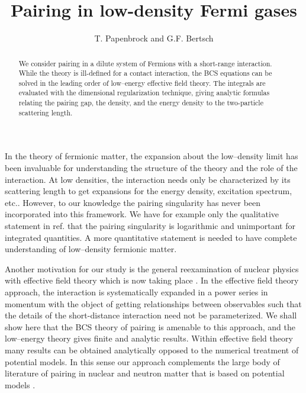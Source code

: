 %    
%
\newcommand{\ignore}[1]{} 
%
%

\draft
\title{Pairing in low-density Fermi gases}
\author{T. Papenbrock and G.F. Bertsch}
\address{Institute for Nuclear Theory\\
University of Washington, Seattle, WA 98195 USA
}
\maketitle
\def\eq#1{eq. (\ref{#1})}
\def\be{\begin{equation}}
\def\ee{\end{equation}} 
\def\ba{\begin{eqnarray}}
\def\ea{\end{eqnarray}} 
\begin{abstract}
We consider pairing in a dilute system of Fermions
with a short-range interaction. While the theory is ill-defined for
a contact interaction, the BCS equations can be solved in the
leading order of low--energy effective field theory.  The integrals
are evaluated with the dimensional regularization technique, giving
analytic formulas relating the pairing gap, the density, and the 
energy density to the two-particle scattering length.
\end{abstract}


In the theory of fermionic matter, the expansion about the low--density
limit has been invaluable for understanding the structure of the
theory and the role of the interaction.  At low densities, the
interaction needs only be characterized by its scattering length
to get expansions for the energy density, excitation spectrum,
etc.\cite{ab63}.  However, to our knowledge the pairing singularity has
never been incorporated into this framework.  We have for
example only the qualitative statement in ref. \cite{ab63} that the pairing 
singularity is logarithmic and unimportant for integrated quantities.  
A more quantitative statement is needed to have complete understanding
of low--density fermionic matter. 

Another motivation for our study is the general reexamination of nuclear 
physics with effective field theory which is now taking place 
\cite{Weinberg1,KoMany,Parka,LMa,GPLa,Bvk,KSW,Hsu}. 
In the effective field theory approach, 
the interaction is systematically expanded in a power series in
momentum with the object of getting relationships between observables
such that the details of the short-distance interaction
need not be parameterized.  We shall show here that the BCS theory of
pairing is amenable to this approach, and the low--energy theory
gives finite and analytic results. 
Within effective field theory many results
can be obtained analytically opposed to the numerical treatment of potential 
models. 
In this sense our approach complements the large body of literature
of pairing in nuclear and neutron matter that is based on potential 
models \cite{Wambach89,Baldo90,Chen93,Takat93,Khodel96,Carlson97,Elgaroy}.
  

